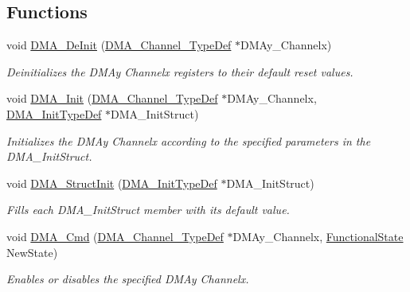 \subsection*{Functions}
\begin{DoxyCompactItemize}
\item 
void \hyperlink{group___d_m_a___exported___functions_ga21ca0d50b13e502db5ab5feb484f9ece}{D\+M\+A\+\_\+\+De\+Init} (\hyperlink{struct_d_m_a___channel___type_def}{D\+M\+A\+\_\+\+Channel\+\_\+\+Type\+Def} $\ast$D\+M\+Ay\+\_\+\+Channelx)
\begin{DoxyCompactList}\small\item\em Deinitializes the D\+M\+Ay Channelx registers to their default reset values. \end{DoxyCompactList}\item 
void \hyperlink{group___d_m_a___exported___functions_ga7c3d1b9dc041f8e5f2cfc8d5dd858278}{D\+M\+A\+\_\+\+Init} (\hyperlink{struct_d_m_a___channel___type_def}{D\+M\+A\+\_\+\+Channel\+\_\+\+Type\+Def} $\ast$D\+M\+Ay\+\_\+\+Channelx, \hyperlink{struct_d_m_a___init_type_def}{D\+M\+A\+\_\+\+Init\+Type\+Def} $\ast$D\+M\+A\+\_\+\+Init\+Struct)
\begin{DoxyCompactList}\small\item\em Initializes the D\+M\+Ay Channelx according to the specified parameters in the D\+M\+A\+\_\+\+Init\+Struct. \end{DoxyCompactList}\item 
void \hyperlink{group___d_m_a___exported___functions_ga0f7f95f750a90a6824f4e9b6f58adc7e}{D\+M\+A\+\_\+\+Struct\+Init} (\hyperlink{struct_d_m_a___init_type_def}{D\+M\+A\+\_\+\+Init\+Type\+Def} $\ast$D\+M\+A\+\_\+\+Init\+Struct)
\begin{DoxyCompactList}\small\item\em Fills each D\+M\+A\+\_\+\+Init\+Struct member with its default value. \end{DoxyCompactList}\item 
void \hyperlink{group___d_m_a___exported___functions_ga8e7cb6b9ae5f142e2961df879cdaba65}{D\+M\+A\+\_\+\+Cmd} (\hyperlink{struct_d_m_a___channel___type_def}{D\+M\+A\+\_\+\+Channel\+\_\+\+Type\+Def} $\ast$D\+M\+Ay\+\_\+\+Channelx, \hyperlink{group___exported__types_gac9a7e9a35d2513ec15c3b537aaa4fba1}{Functional\+State} New\+State)
\begin{DoxyCompactList}\small\item\em Enables or disables the specified D\+M\+Ay Channelx. \end{DoxyCompactList}\item 

\end{DoxyCompactItemize}
